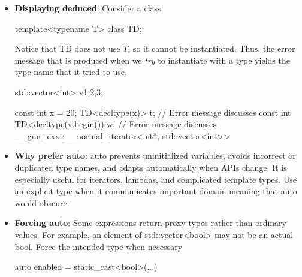 \documentclass{report}
\begin{document}
\begin{itemize}
\begin{cppcode}
            f(arr);
            \end{cppcode}
            \bigbreak \noindent 
            $T$ is deduced as int[10], and $p$ is int (\&)[10];
            \bigbreak \noindent 
            Interestingly, the ability to declare references to arrays enables creation of a template that deduces the number of elements that an array contains
            \bigbreak \noindent 
            \begin{cppcode}
                template<typename T, std::size_t N> constexpr std::size_t array_size(T (&)[N]) noexcept { return N; }
            \end{cppcode}
        \item \textbf{Displaying deduced}: Consider a class
            \bigbreak \noindent 
            \begin{cppcode}
            template<typename T>
            class TD;
            \end{cppcode}
            \bigbreak \noindent 
            Notice that TD does not use $T$, so it cannot be instantiated. Thus, the error message that is produced when we \textit{try} to instantiate with a type yields the type name that it tried to use. 
            \bigbreak \noindent 
            \begin{cppcode}
                std::vector<int> v{1,2,3};

                const int x = 20;
                TD<decltype(x)> t; // Error message discusses const int
                TD<decltype(v.begin()) w; // Error message discusses __gnu_cxx::__normal_iterator<int*, std::vector<int>>
            \end{cppcode}
        \item \textbf{Why prefer auto}: auto prevents uninitialized variables, avoids incorrect or duplicated type names, and adapts automatically when APIs change. It is especially useful for iterators, lambdas, and complicated template types.
            \bigbreak \noindent 
            Use an explicit type when it communicates important domain meaning that auto would obscure.
        \item \textbf{Forcing auto}: Some expressions return proxy types rather than ordinary values. For example, an element of std::vector<bool> may not be an actual bool.
            \bigbreak \noindent 
            Force the intended type when necessary
            \bigbreak \noindent 
            \begin{cppcode}
            auto enabled = static_cast<bool>(...)
            \end{cppcode}


    \end{itemize}
\end{document}
